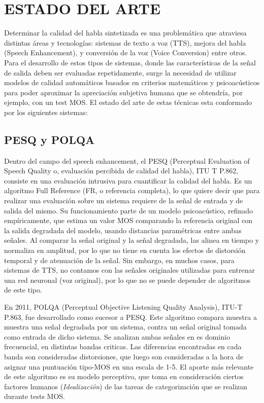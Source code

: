 \section{ESTADO DEL ARTE}
Determinar la calidad del habla sintetizada es una problemática que atraviesa distintas áreas y tecnologías: sistemas de texto a voz (TTS), mejora del habla (Speech Enhancement), y conversión de la voz (Voice Conversion) entre otros. Para el desarrollo de estos tipos de sistemas, donde las características de la señal de salida deben ser evaluadas repetidamente, surge la necesidad de utilizar modelos de calidad automáticos basados en criterios matemáticos y psicoacústicos para poder aproximar la apreciación subjetiva humana que se obtendría, por ejemplo, con un test MOS. El estado del arte de estas técnicas esta conformado por los siguientes sistemas:



\subsection{PESQ y POLQA}
Dentro del campo del speech enhancement, el PESQ \cite{pesq} (Perceptual Evaluation of Speech Quality o, evaluación percibida de calidad del habla), ITU T P.862, consiste en una evaluación intrusiva para cuantificar la calidad del habla. Es un algoritmo Full Reference (FR, o referencia completa), lo que quiere decir que para realizar una evaluación sobre un sistema requiere de la señal de entrada y de salida del mismo.  Su funcionamiento parte de un modelo psicoacústico, refinado empíricamente, que estima un valor MOS comparando la referencia original con la salida degradada del modelo, usando distancias paramétricas entre ambas señales. Al comparar la señal original y la señal degradada, las alinea en tiempo y normaliza en amplitud, por lo que no tiene en cuenta los efectos de distorsión temporal y de atenuación de la señal. Sin embargo, en muchos casos, para sistemas de TTS, no contamos con las señales originales utilizadas para entrenar una red neuronal (voz original), por lo que no se puede depender de algoritmos de este tipo.

En 2011, POLQA (Perceptual Objective Listening Quality Analysis)\cite{polqa}, ITU-T P.863, fue desarrollado como sucesor a PESQ. Este algoritmo compara muestra a muestra una señal degradada por un sistema, contra un señal original tomada como entrada de dicho sistema. Se analizan ambas señales en es dominio frecuencial, en distintas bandas criticas. Las diferencias encontradas  en cada banda son consideradas distorsiones, que luego son consideradas a la hora de asignar una puntuación tipo-MOS en una escala de 1-5. El aporte más relevante de este algoritmo es su modelo perceptivo, que toma en consideración ciertos factores humanos (\textit{Idealización}) de las tareas de categorización que se realizan durante tests MOS.

